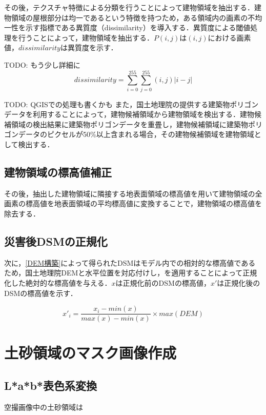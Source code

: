      その後，テクスチャ特徴による分類を行うことによって建物領域を抽出する．建物領域の屋根部分は均一であるという特徴を持つため，ある領域内の画素の不均一性を示す指標である異質度（dissimilarity）\cite{論文手法3}を導入する．異質度による閾値処理を行うことによって，建物領域を抽出する．$P(i,j)$は$(i,j)$における画素値，$dissimilarity$は異質度を示す．

      TODO: もう少し詳細に
      \begin{equation}
        \label{異質度}
        dissimilarity = \sum_{i=0}^{255} \sum_{j=0}^{255} (i,j) |i-j|
      \end{equation}

      TODO: QGISでの処理も書くかも
      また，国土地理院の提供する建築物ポリゴンデータ\cite{}を利用することによって，建物候補領域から建物領域を検出する．建物候補領域の検出結果に建築物ポリゴンデータを重畳し，建物候補領域に建築物ポリゴンデータのピクセルが50\%以上含まれる場合，その建物候補領域を建物領域として検出する．

    \subsection{建物領域の標高値補正}
      その後，抽出した建物領域に隣接する地表面領域の標高値を用いて建物領域の全画素の標高値を地表面領域の平均標高値に変換することで，建物領域の標高値を除去する．

    \subsection{災害後DSMの正規化}
      次に，\ref{DEM構築}によって得られたDSMはモデル内での相対的な標高値であるため，国土地理院DEMと水平位置を対応付けし，を適用することによって正規化した絶対的な標高値を与える．$x$は正規化前のDSMの標高値，$x'$は正規化後のDSMの標高値を示す．

      \begin{equation}
        \label{正規化}
        x'_{i} = \dfrac{x_{i} - min(x)} {max(x) - min(x)} \times max(DEM) 
      \end{equation}


  \section{土砂領域のマスク画像作成}
    \label{土砂マスク}
    \subsection{L*a*b*表色系変換}
      空撮画像中の土砂領域は




